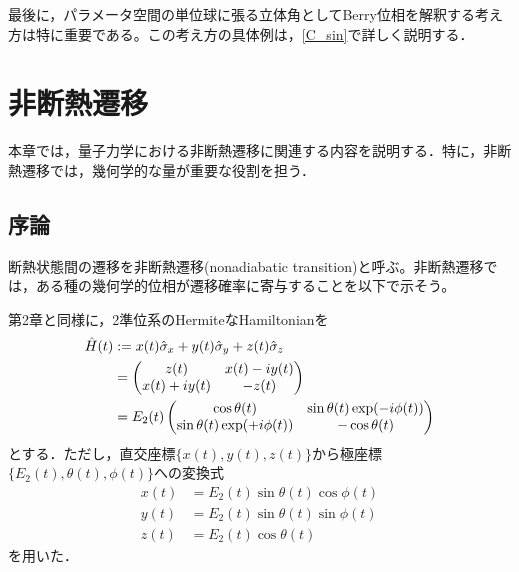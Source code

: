 \documentclass[a4paper, titlepage]{jsreport}
\begin{document}
最後に，パラメータ空間の単位球に張る立体角としてBerry位相を解釈する考え方は特に重要である。この考え方の具体例は，\ref{C_sin}で詳しく説明する．


\chapter{非断熱遷移}\label{NT}
本章では，量子力学における非断熱遷移に関連する内容を説明する．特に，非断熱遷移では，幾何学的な量が重要な役割を担う．


\section{序論}
断熱状態間の遷移を非断熱遷移(nonadiabatic transition)と呼ぶ。非断熱遷移では，ある種の幾何学的位相が遷移確率に寄与することを以下で示そう。


第2章と同様に，2準位系のHermiteなHamiltonianを
\begin{align}
  \Hat{H}(t)&:=x(t)\Hat{\sigma}_x + y(t) \Hat{\sigma}_y + z(t) \Hat{\sigma}_z\\
  &=
  \begin{pmatrix} 
  z(t) & x(t) - iy(t)\\
  x(t) + iy(t) & -z(t)\\
  \end{pmatrix}\\
  &= E_2(t)
  \begin{pmatrix} 
  \cos \theta(t)&\sin \theta(t) \exp(-i\phi(t))\\
  \sin \theta(t) \exp(+i\phi(t))&-\cos \theta(t)\\
  \end{pmatrix}
\end{align}
とする．ただし，直交座標$\{x(t), y(t), z(t)\}$から極座標$\{E_2(t), \theta(t), \phi(t)\}$への変換式
\begin{align}
  x(t) &= E_2(t) \sin \theta(t) \cos \phi(t)\\
  y(t) &= E_2(t) \sin \theta(t) \sin \phi(t)\\
  z(t) &= E_2(t) \cos \theta(t)
\end{align}
を用いた．
\end{document}
